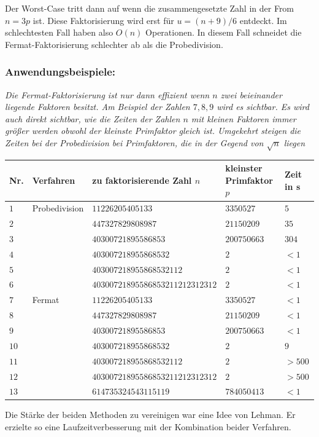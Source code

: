 \documentclass[10pt, bigheadings]{scrartcl}
\begin{document}
Der Worst-Case tritt dann auf wenn die zusammengesetzte Zahl in der From
$n = 3p$ ist. Diese Faktorisierung wird erst für $u = (n+9)/6$ entdeckt.
Im schlechtesten Fall haben also $O(n)$ Operationen. In diesem Fall schneidet
die Fermat-Faktorisierung schlechter ab als die Probedivision.

\subsubsection*{Anwendungsbeispiele:}
{\it
Die Fermat-Faktorisierung ist nur dann effizient wenn $n$ zwei beieinander liegende
Faktoren besitzt. Am Beispiel der Zahlen $7,8,9$ wird es sichtbar. Es wird
auch direkt sichtbar, wie die Zeiten der Zahlen $n$ mit kleinen Faktoren
immer größer werden obwohl der kleinste Primfaktor gleich ist. Umgekehrt
steigen die Zeiten bei der Probedivision bei Primfaktoren,
die in der Gegend von $\sqrt{n}$ liegen }
\begin{center}
\begin{tabular}{|l|l|l|l|l|}
\hline
Nr. & Verfahren & zu faktorisierende Zahl $n$ & kleinster Primfaktor $p$ & Zeit in s\\
\hline
$1$& Probedivision & $11226205405133$ & $3350527$ & $5$\\
$2$&	& $447327829808987$ & $21150209$ & $35$\\
$3$&	& $40300721895586853$  & $200750663$ & $304$\\
$4$&	& $403007218955868532$ & $2$ & $<1$\\
$5$&	& $403007218955868532112$ & $2$ & $<1$\\
$6$&	& $40300721895586853211212312312$ & $2$ & $<1$\\
\hline
$7$& Fermat & $11226205405133$ & $3350527$ & $<1$\\
$8$&	& $447327829808987$ & $21150209$ & $<1$\\
$9$&	& $40300721895586853$  & $200750663$ & $<1$\\
$10$&	& $403007218955868532$ & $2$ & $9$\\
$11$&	& $403007218955868532112$ & $2$ & $>500$\\
$12$&	& $40300721895586853211212312312$ & $2$ & $>500$\\
$13$&	& $614735324543115119$ & $784050413$ & $<1$\\
\hline
\end{tabular}
\end{center}
Die Stärke der beiden Methoden zu vereinigen war eine Idee von Lehman. Er erzielte
so eine Laufzeitverbesserung mit der Kombination beider Verfahren.
\end{document}
